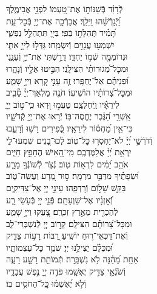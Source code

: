 \documentclass[twoside, openany, parskip=half, 11pt]{book}
\begin{document}
\begin{narrow}
לְֿדָוִ֗ד \hfill
בְּֿשַׁנּוֹת֣וֹ אֶת־טַ֭עְמוֹ לִפְנֵ֣י אֲבִימֶ֑לֶךְ\\ וַ֝יְֿגָרְֿשֵׁ֗הוּ וַיֵּלַֽךְ׃ \hfill
אֲבָרְֿכָ֣ה אֶת־יְיָ֣ בְּֿכׇל־עֵ֑ת \\ תָּ֝מִ֗יד תְּֽֿהִלָּת֥וֹ בְּֿפִֽי׃ \hfill
בַּייָ֭ תִּתְהַלֵּ֣ל נַפְשִׁ֑י\\ יִשְׁמְע֖וּ עֲנָוִ֣ים וְֿיִשְׂמָֽחוּ׃ \hfill
גַּדְּל֣וּ לַייָ֣ אִתִּ֑י\\ וּנְרוֹמְמָ֖ה שְֿׁמ֣וֹ יַחְדָּֽו׃ \hfill
דָּרַ֣שְׁתִּי אֶת־יְיָ֣ וְֿעָנָ֑נִי\\ וּמִכׇּל־מְ֝גוּרוֹתַ֗י הִצִּילָֽנִי׃ \hfill
הִבִּ֣יטוּ אֵלָ֣יו וְֿנָהָ֑רוּ\\ וּ֝פְנֵיהֶ֗ם אַל־יֶחְפָּֽרוּ׃ \hfill
זֶ֤ה עָנִ֣י קָ֭רָא וַייָ֣ שָׁמֵ֑עַ\\ וּמִכׇּל־צָ֝רוֹתָ֗יו הוֹשִׁיעֽוֹ׃ \hfill
חֹנֶ֤ה מַלְאַךְ־יְיָ֓ סָ֘בִ֤יב\\ לִירֵאָ֗יו וַֽיְֿחַלְּצֵֽם׃ \hfill
טַעֲמ֣וּ וּ֭רְאוּ כִּֽי־ט֣וֹב יְיָ֑\\ אַֽשְׁרֵ֥י הַ֝גֶּ֗בֶר יֶחֱסֶה־בּֽוֹ׃ \hfill
יְֿר֣אוּ אֶת־יְיָ֣ קְֿדֹשָׁ֑יו\\ כִּי־אֵ֥ין מַ֝חְס֗וֹר לִירֵאָֽיו׃ \hfill
כְּֿ֭פִירִים רָשׁ֣וּ וְֿרָעֵ֑בוּ\\ וְֿדֹרְֿשֵׁ֥י יְ֝יָ֗ לֹא־יַחְסְר֥וּ כׇל־טֽוֹב׃ \hfill
לְֽֿכוּ־בָ֭נִים שִׁמְעוּ־לִ֑י\\ יִֽרְאַ֥ת יְ֝יָ֗ אֲלַמֶּדְכֶֽם׃ \hfill
מִֽי־הָ֭אִישׁ הֶחָפֵ֣ץ חַיִּ֑ים\\ אֹהֵ֥ב יָ֝מִ֗ים לִרְא֥וֹת טֽוֹב׃ \hfill
נְֿצֹ֣ר לְֿשׁוֹנְֿךָ֣ מֵרָ֑ע\\ וּ֝שְׂפָתֶ֗יךָ מִדַּבֵּ֥ר מִרְמָֽה׃ \hfill
ס֣וּר מֵ֭רָע וַעֲשֵׂה־ט֑וֹב\\ בַּקֵּ֖שׁ שָׁל֣וֹם וְֿרׇדְפֵֽהוּ׃ \hfill
עֵינֵ֣י יְיָ֭ אֶל־צַדִּיקִ֑ים\\ וְֿ֝אׇזְנָ֗יו אֶל־שַׁוְעָתָֽם׃ \hfill
פְּֿנֵ֣י יְיָ֭ בְּֿעֹ֣שֵׂי רָ֑ע\\ לְֿהַכְרִ֖ית מֵאֶ֣רֶץ זִכְרָֽם׃ \hfill
צָ֭עֲקוּ וַייָ֣ שָׁמֵ֑עַ\\ וּמִכׇּל־צָ֝רוֹתָ֗ם הִצִּילָֽם׃ \hfill
קָר֣וֹב יְיָ֭ לְֿנִשְׁבְּרֵי־לֵ֑ב\\ וְֽֿאֶת־דַּכְּאֵי־ר֥וּחַ יוֹשִֽׁיעַ׃ \hfill
רַ֭בּוֹת רָע֣וֹת צַדִּ֑יק\\ וּ֝מִכֻּלָּ֗ם יַצִּילֶ֥נּוּ יְיָ׃ \hfill
שֹׁמֵ֥ר כׇּל־עַצְמוֹתָ֑יו\\ אַחַ֥ת מֵ֝הֵ֗נָּה לֹ֣א נִשְׁבָּֽרָה׃ \hfill
תְּֿמוֹתֵ֣ת רָשָׁ֣ע רָעָ֑ה\\ וְֿשֹׂנְֿאֵ֖י צַדִּ֣יק יֶאְשָֽׁמוּ׃ \hfill
פֹּדֶ֣ה יְיָ֭ נֶ֣פֶשׁ עֲבָדָ֑יו\\ וְֿלֹ֥א יֶ֝אְשְׁמ֗וּ \hfill כׇּֽל־הַחֹסִ֥ים בּֽוֹ׃ \\




\end{narrow}
\end{document}
